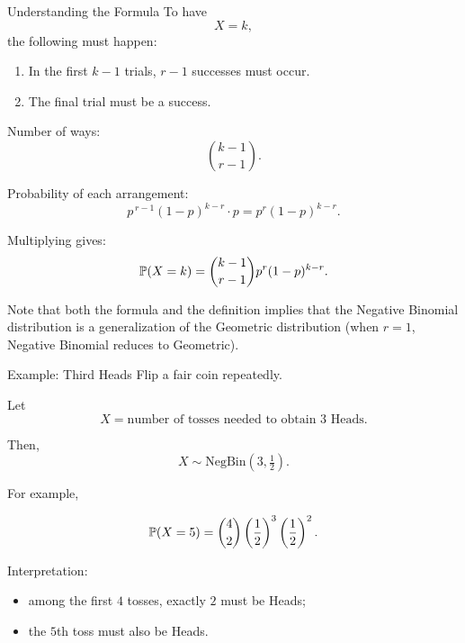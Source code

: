 \begin{frame}{Understanding the Formula}
To have
\[
X=k,
\]
the following must happen:

\vspace{0.25cm}

\begin{enumerate}
    \item In the first $k-1$ trials, $r-1$ successes must occur.
    \item The final trial must be a success.
\end{enumerate}

\vspace{0.25cm}

Number of ways:
\[
\binom{k-1}{r-1}.
\]

\vspace{0.25cm}

Probability of each arrangement:
\[
p^{\,r-1}(1-p)^{k-r}\cdot p
=
p^r(1-p)^{k-r}.
\]

\vspace{0.25cm}

Multiplying gives:
\[
\mathbb{P}(X=k)
=
\binom{k-1}{r-1}
p^r(1-p)^{k-r}.
\]

Note that both the formula and the definition implies that the Negative Binomial distribution is a generalization of the Geometric distribution (when $r=1$, Negative Binomial reduces to Geometric).
\end{frame}

\begin{frame}{Example: Third Heads}
Flip a fair coin repeatedly.

Let
\[
X=\text{number of tosses needed to obtain 3 Heads}.
\]

Then,
\[
X\sim\text{NegBin}(3,\tfrac12).
\]

\vspace{0.25cm}

For example,

\[
\mathbb{P}(X=5)
=
\binom{4}{2}
\left(\frac12\right)^3
\left(\frac12\right)^2.
\]

\vspace{0.25cm}

Interpretation:
\begin{itemize}
    \item among the first $4$ tosses, exactly $2$ must be Heads;
    \item the $5$th toss must also be Heads.
\end{itemize}


\end{frame}



